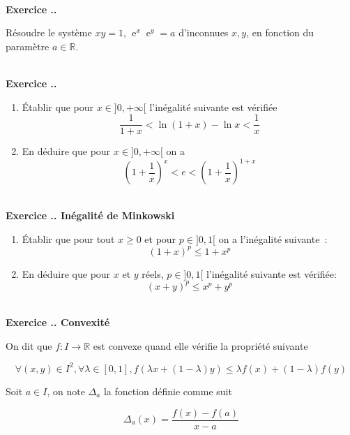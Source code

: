 \documentclass{article}
\newcommand{\ex}{{\operatorname{e}}}
\newcommand{\mb}[1]{\mathbb{#1}}
\newcounter{exo}
\newcommand{\exercice}[1][\null]{\textbf{\\ Exercice \thesection.\theexo. #1} \addtocounter{exo}{1}}
\begin{document}
\exercice

Résoudre le système $xy = 1$, ${\ex}^x {\ex}^y =a$ d'inconnues $x,y$, en fonction du paramètre $a \in \mb{R}$.


\exercice 

\begin{enumerate}
    \item Établir que pour $x \in ]0, +\infty[$ l'inégalité suivante
        est vérifiée
        \begin{equation*}
            \frac{1}{1+x} < \ln (1 + x) - \ln x < \frac{1}{x}
        \end{equation*}

    \item En déduire que pour $x \in ]0,+\infty[$ on a
        \begin{equation*}
            \left(1 + \frac{1}{x}\right)^x < e < \left(1 + \frac{1}{x}\right)^{1 + x}
        \end{equation*}
\end{enumerate}

\exercice[Inégalité de Minkowski]

\begin{enumerate}
    \item Établir que pour tout $x \geq 0$ et pour $p \in ]0,1[$ on a 
        l'inégalité suivante~:
        \begin{equation*}
            (1 + x)^p \leq 1 + x^p
        \end{equation*}

    \item En déduire que pour $x$ et $y$ réels, $p \in ]0,1[$
        l'inégalité suivante est vérifiée:
        \begin{equation*}
            (x + y)^p \leq x^p + y^p
        \end{equation*}
\end{enumerate}



\exercice[Convexité]

On dit que $f : I \to \mb{R}$ est convexe quand elle vérifie 
la propriété suivante

\begin{equation*}
    \forall (x,y) \in I^2, \forall \lambda \in [0,1], 
    f(\lambda x + (1-\lambda)y) \leq \lambda f(x) + (1-\lambda) f(y)
\end{equation*}

Soit $a \in I$, on note $\Delta_a$ la fonction définie comme suit

\begin{equation*}
    \Delta_a (x) = \frac{f(x) - f(a)}{x - a}
\end{equation*}
\end{document}
